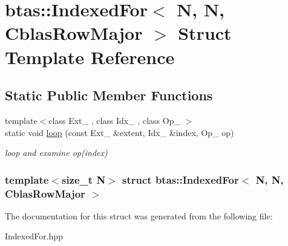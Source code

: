 \hypertarget{structbtas_1_1_indexed_for_3_01_n_00_01_n_00_01_cblas_row_major_01_4}{
\section{btas::IndexedFor$<$ N, N, CblasRowMajor $>$ Struct Template Reference}
\label{structbtas_1_1_indexed_for_3_01_n_00_01_n_00_01_cblas_row_major_01_4}
}
\subsection*{Static Public Member Functions}
\begin{DoxyCompactItemize}
\item 
\hypertarget{structbtas_1_1_indexed_for_3_01_n_00_01_n_00_01_cblas_row_major_01_4_af18f6b91572462a8e0202632b5003649}{
{\footnotesize template$<$class Ext\_\- , class Idx\_\- , class Op\_\- $>$ }\\static void \hyperlink{structbtas_1_1_indexed_for_3_01_n_00_01_n_00_01_cblas_row_major_01_4_af18f6b91572462a8e0202632b5003649}{loop} (const Ext\_\- \&extent, Idx\_\- \&index, Op\_\- op)}
\label{structbtas_1_1_indexed_for_3_01_n_00_01_n_00_01_cblas_row_major_01_4_af18f6b91572462a8e0202632b5003649}

\begin{DoxyCompactList}\small\item\em loop and examine op(index) \item\end{DoxyCompactList}\end{DoxyCompactItemize}
\subsubsection*{template$<$size\_\-t N$>$ struct btas::IndexedFor$<$ N, N, CblasRowMajor $>$}



The documentation for this struct was generated from the following file:\begin{DoxyCompactItemize}
\item 
IndexedFor.hpp\end{DoxyCompactItemize}
